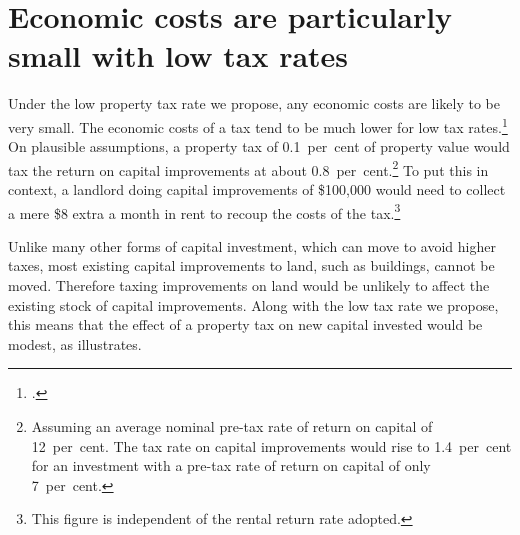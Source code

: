\documentclass[twoside,english]{palatinob5ona4portrait}
\begin{document}
\section{\label{sec:PROP-4-3}Economic costs are particularly small with low tax rates}
Under the low property tax rate we propose, any economic costs are likely to be very small. The economic costs of a tax tend to be much lower for low tax rates.\footcite[][18]{KPMGEconotech2011-GST}  On plausible assumptions, a property tax of 0.1~per~cent of property value would tax the return on capital improvements at about 0.8~per~cent.\footnote{Assuming an average nominal pre-tax rate of return on capital of 12~per~cent. The tax rate on capital improvements would rise to 1.4~per~cent for an investment with a pre-tax rate of return on capital of only 7~per~cent.}  To put this in context, a landlord doing capital improvements of \$100,000 would need to collect a mere \$8 extra a month in rent to recoup the costs of the tax.\footnote{This figure is independent of the rental return rate adopted.}

Unlike many other forms of capital investment, which can move to avoid higher taxes, most existing capital improvements to land, such as buildings, cannot be moved. Therefore taxing improvements on land would be unlikely to affect the existing stock of capital improvements. Along with the low tax rate we propose, this means that the effect of a property tax on new capital invested would be modest, as  illustrates.  
\end{document}
